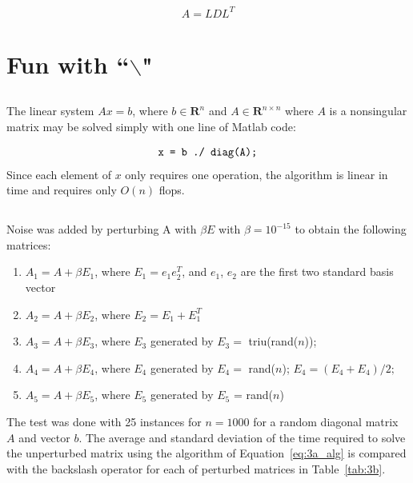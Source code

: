 \documentclass[11pt]{article} %
\begin{document}
\begin{equation}
\boxed{A= L D L^{T}}
\end{equation}

\section{Fun with ``$\backslash$"}

\subsection{} %

The linear system $Ax = b$, where $b \in \mathbf{R}^n $ and $A \in \mathbf{R}^{n×n}$ where $A$ is a nonsingular matrix may be solved simply with one line of Matlab code:

\begin{equation}
\begin{array}{l@{}l}
\verb!x = b ./ diag(A); !\\
\end{array}
\label{eq:3a_alg}
\end{equation}
Since each element of $x$ only requires one operation, the algorithm is linear in time and requires only $O(n)$ flops.

\subsection{} %

Noise was added by perturbing A with $\beta E$ with $\beta = 10^{-15}$ to obtain the following matrices:
\begin{enumerate}
\item $A_1 = A + \beta E_1$, where $E_1 = e_1 e_2^T$, and $e_1 $, $e_2$ are the first two standard basis vector
\item $A_2 = A + \beta E_2$, where $E_2 = E_1 + E_1^T$
\item $A_3 = A + \beta E_3$, where $E_3$ generated by $E_3 =$ triu(rand($n$));
\item $A_4 = A + \beta E_4$, where $E_4$ generated by $E_4 =$ rand($n$);
$E_4 = (E_4 + E_4 )/2;$

\item $A_5 = A + \beta E_5$, where $E_5$ generated by $E_5$ = rand($n$)
\end{enumerate}

The test was done with 25 instances for $n =1000$ for a random diagonal matrix $A$ and vector $b$. The average and standard deviation of the time required to solve the unperturbed matrix using the algorithm of Equation~\ref{eq:3a_alg} is compared with the backslash operator for each of perturbed matrices in Table~\ref{tab:3b}.
\end{document}
